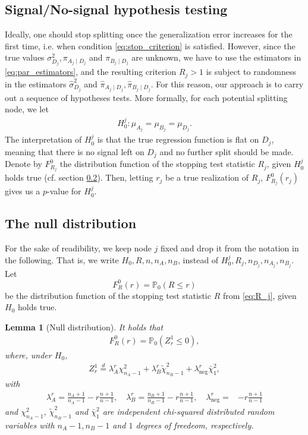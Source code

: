 \documentclass[11pt,a4paper]{article}
\newtheorem{lemma}{Lemma}
\renewcommand{\P}{\operatorname{P}}
\renewcommand{\P}{\mathbb{P}}  %
\newcommand{\eqdis}{\stackrel{d}{=}}
\begin{document}
\subsection{Signal/No-signal hypothesis testing}
Ideally, one should stop splitting once the generalization error increases for the first time, i.e. when condition \eqref{eq:stop_criterion} is satisfied. However, since the true values $\sigma^2_{D_j}, \pi_{A_j \mid D_j}$ and $\pi_{B_j \mid D_j}$ are unknown, we have to use the estimators in \eqref{eq:par_estimators}, and the resulting criterion $R_j > 1$ is subject to randomness in the estimators $\hat \sigma^2_{D_j}$ and $\hat \pi_{A_j \mid D_j}, \hat \pi_{B_j \mid D_j}$. For this reason, our approach is to carry out a sequence of hypotheses tests. More formally, for each potential splitting node, we let
\begin{align}
	H^j_0 \colon \mu_{A_j} = \mu_{B_j} = \mu_{D_j}.
\end{align}
The interpretation of $H_0^j$ is that the true regression function is flat on $D_j$, meaning that there is no signal left on $D_j$ and no further split should be made. Denote by $F^0_{R_j}$ the distribution function of the stopping test statistic $R_j$, given $H_0^j$ holds true (cf. section \ref{sec:null_dist}). Then, letting $r_j$ be a true realization of $R_j$,
$
	F_{R_j}^0(r_j)
$
gives us a $p$-value for $H_0^j$.

\subsection{The null distribution}\label{sec:null_dist}
For the sake of readibility, we keep node $j$ fixed and drop it from the notation in the following. That is, we write $H_0, R, n, n_{A}, n_{B}$, instead of $H_0^j, R_j, n_{D_j}, n_{A_j}, n_{B_j}$. Let
$$
	F^0_R(r) = \P_0(R \leq r)
$$
be the distribution function of the stopping test statistic $R$ from \eqref{eq:R_j}, given $H_0$ holds true.
\begin{lemma}[Null distribution]\label{lem:distr_R}
	It holds that
	\begin{align*}
		F_R^0(r) = \P_0(Z_r^1 \leq 0),
	\end{align*}
	where, under $H_0$,
	\begin{align}\label{eq:Z_r}
		Z_r^1 \eqdis
		\lambda_A^r \chi^2_{n_A -1}
		+ \lambda_B^r \tilde \chi^2_{n_B -1}
		+ \lambda_{\text{neg}}^r \bar \chi_1^2,
	\end{align}
	with
	\begin{align*}
		\lambda_A^r =             \frac{n_A +1}{n_A -1} - r\frac{n+1}{n-1}, \quad
		\lambda_B^r =             \frac{n_B +1}{n_B -1} - r\frac{n+1}{n-1}, \quad
		\lambda_{\text{neg}}^r = & -r\frac{n+1}{n-1}
	\end{align*}
	and $\chi^2_{n_A -1}$, $\tilde \chi^2_{n_B -1}$ and $\bar \chi_1^2$ are independent chi-squared distributed random variables with $n_A - 1, n_B -1$ and $1$ degrees of freedeom, respectively.
\end{lemma}
\end{document}
